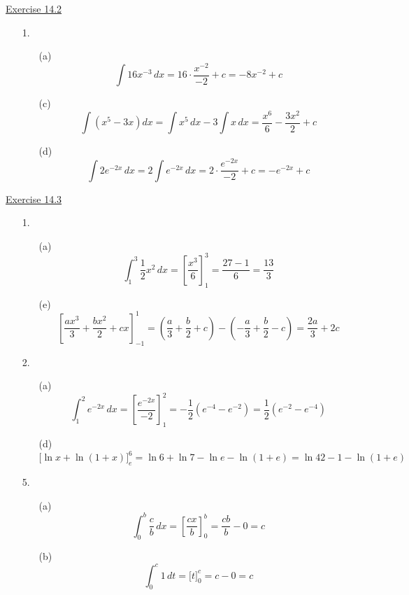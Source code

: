 \underline{Exercise 14.2}
\begin{enumerate}
\item[1.]
\begin{enumerate}
\item[(a)] 
\[\int 16x^{-3}\, dx = 16 \cdot \frac{x^{-2}}{-2} + c = -8x^{-2} + c\]

\item[(c)] 
\[\int \left(x^{5}-3x\right) dx = \int x^{5}\, dx - 3\int x\, dx = \frac{x^{6}}{6} - \frac{3x^{2}}{2} + c\]

\item[(d)] 
\[\int 2e^{-2x}\, dx = 2\int e^{-2x}\, dx = 2 \cdot \frac{e^{-2x}}{-2} + c = -e^{-2x} + c\]

\end{enumerate}

\end{enumerate}

\underline{Exercise 14.3}
\begin{enumerate}
\item[1.]
\begin{enumerate}
\item[(a)] 
\[\int_{1}^{3} \frac{1}{2}x^{2}\, dx = \left[\frac{x^{3}}{6}\right]_{1}^{3} = \frac{27 - 1}{6} = \frac{13}{3}\]

\item[(e)] 
\[\left[\frac{ax^{3}}{3}+\frac{bx^{2}}{2}+cx\right]_{-1}^{1} = \left(\frac{a}{3}+\frac{b}{2}+c\right)-\left(-\frac{a}{3}+\frac{b}{2}-c\right) = \frac{2a}{3}+2c\]

\end{enumerate}

\item[2.]
\begin{enumerate}
\item[(a)] 
\[\int_{1}^{2} e^{-2x}\, dx = \left[\frac{e^{-2x}}{-2}\right]_{1}^{2} = -\frac{1}{2}\left(e^{-4}-e^{-2}\right) = \frac{1}{2}\left(e^{-2}-e^{-4}\right)\]

\item[(d)] 
\[\Big[\ln x + \ln(1+x)\Big]_{e}^{6} = \ln 6 + \ln 7 - \ln e - \ln(1+e) = \ln 42 - 1 - \ln(1+e)\]

\end{enumerate}

\item[5.]
\begin{enumerate}
\item[(a)] 
\[\int_{0}^{b} \frac{c}{b}\, dx = \left[\frac{cx}{b}\right]_{0}^{b} = \frac{cb}{b} - 0 = c\]

\item[(b)] 
\[\int_{0}^{c} 1\, dt = \Big[t\Big]_{0}^{c} = c - 0 = c\]

\end{enumerate}

\end{enumerate}

